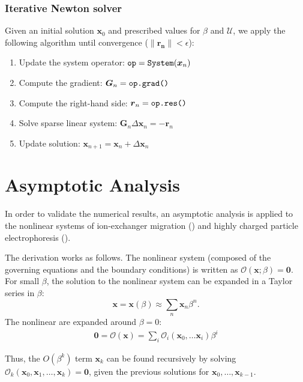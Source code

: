\documentclass[10pt]{ijnam}
\newcommand\eps \epsilon
\newcommand\bx{\boldsymbol{x}}
\newcommand\bzero{\boldsymbol{0}}
\newcommand\cO{\mathcal{O}}
\newcommand\cU{\mathscr{U}}
\begin{document}
\subsubsection{Iterative Newton solver}
Given an initial solution $\bx_0$ and prescribed values for $\beta$ and $\cU$, 
we apply the following algorithm 
until convergence ($\|\boldsymbol{r_n}\| < \eps$):
\begin{enumerate}
\item Update the system operator: $\verb|op| = \verb|System|(\bx_{n})$
\item Compute the gradient: $\boldsymbol{G}_n = \verb|op.grad()|$
\item Compute the right-hand side: $\boldsymbol{r}_n = \verb|op.res()|$
\item Solve sparse linear system: $\boldsymbol{G}_n \Delta \bx_n = -\boldsymbol{r}_n$
\item Update solution: $\bx_{n+1} = \bx_{n} + \Delta \bx_{n}$
\end{enumerate}

\section{Asymptotic Analysis} \label{sec:asymp}
In order to validate the numerical results, an asymptotic analysis is applied 
to the nonlinear systems of ion-exchanger migration (\cite{yariv2010migration, zeyde2012report})
and highly charged particle electrophoresis (\cite{schnitzer2012surface, schnitzer2012cubic}).

The derivation works as follows.
The nonlinear system (composed of the governing equations and the boundary conditions) 
is written as $\cO(\bx;\beta) = \bzero$.
For small $\beta$, the solution to the nonlinear system can be expanded in a Taylor series in $\beta$:
\begin{equation}
\bx = \bx(\beta) \approx \sum_n \bx_n \beta^n.
\end{equation}
The nonlinear 
are expanded around $\beta = 0$:
\begin{eqnarray*}
\bzero = \cO(\bx) = \sum_i \cO_i(\bx_0, \ldots \bx_i) \beta^i
\end{eqnarray*}

Thus, the $O(\beta^k)$ term $\bx_k$ can be found recursively by solving 
$\cO_k(\bx_0, \bx_1, \ldots, \bx_k) = \bzero$,
given the previous solutions for $\bx_0, \ldots, \bx_{k-1}$.
\end{document}
